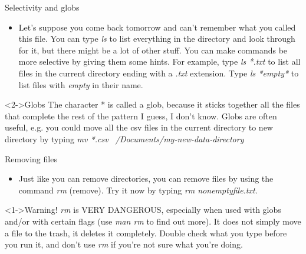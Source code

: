 \documentclass{beamer}
\begin{document}
\begin{frame}{Selectivity and globs}
\begin{itemize}
    \item<1-> Let's suppose you come back tomorrow and can't remember what you called this file. You can type \emph{ls} to list everything in the directory and look through for it, but there might be a lot of other stuff. You can make commands be more selective by giving them some hints. For example, type \emph{ls *.txt} to list all files in the current directory ending with a \textit{.txt} extension. Type \emph{ls *empty*} to list files with \textit{empty} in their name.
\end{itemize}
\begin{block}<2->{Globs}
The character * is called a glob, because it sticks together all the files that complete the rest of the pattern I guess, I don't know. Globs are often useful, e.g. you could move all the csv files in the current directory to new directory by typing \emph{mv *.csv ~/Documents/my-new-data-directory}
\end{block}

\end{frame}

\begin{frame}{Removing files}
\begin{itemize}
    \item<1-> Just like you can remove directories, you can remove files by using the command \emph{rm} (remove). Try it now by typing \emph{rm nonemptyfile.txt}. 
\end{itemize}
\begin{alertblock}<1->{Warning!}
\emph{rm} is VERY DANGEROUS, especially when used with globs and/or with certain flags (use \emph{man rm} to find out more). It does not simply move a file to the trash, it deletes it completely. Double check what you type before you run it, and don't use \emph{rm} if you're not sure what you're doing. 
\end{alertblock}
\end{frame}
\end{document}
